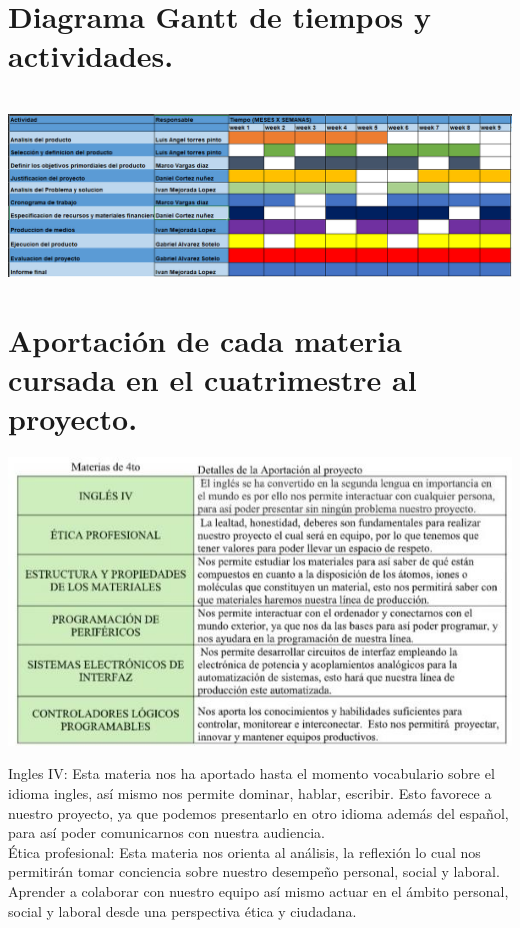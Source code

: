 \documentclass[10pt,a4paper]{article}
\begin{document}
\section{Diagrama Gantt de tiempos y actividades.}\\
\includegraphics[scale=.42]{gantt.png} 
\\
\centering
\section{Aportación de cada materia cursada en el cuatrimestre al proyecto.}
\includegraphics[scale=.68]{tabla.jpeg} \\
\raggedright
\bigskip 
Ingles IV: Esta materia nos ha aportado hasta el momento vocabulario sobre el idioma ingles, así mismo nos permite dominar, hablar, escribir. Esto favorece a nuestro proyecto, ya que podemos presentarlo en otro idioma además del español, para así poder comunicarnos con nuestra audiencia.\\

Ética profesional: Esta materia nos orienta al análisis, la reflexión lo cual nos permitirán tomar conciencia sobre nuestro desempeño personal, social y laboral. Aprender a colaborar con nuestro equipo así mismo actuar en el ámbito personal, social y laboral desde una perspectiva ética y ciudadana.\\
\end{document}
